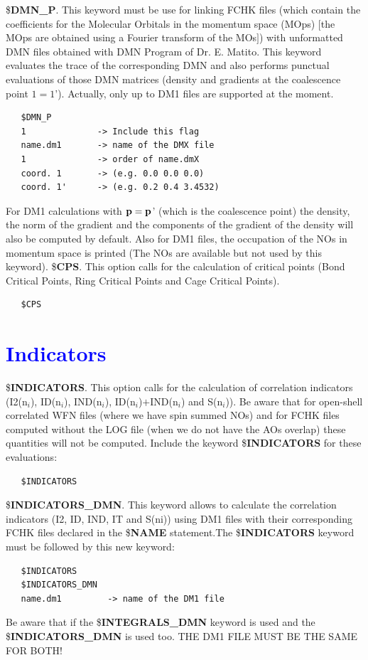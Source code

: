 \documentclass[10pt,a4paper]{article}
\newcommand{\tbl}[1]{{\textcolor{blue}{#1}}}
\begin{document}
\newline
\newline
\noindent \$\textbf{DMN\_P}. This keyword must be use for linking FCHK files (which contain the coefficients for the Molecular Orbitals in the momentum space (MOps) $[$the MOps are obtained using a Fourier transform of the MOs$]$) with unformatted DMN files obtained with DMN Program of Dr. E. Matito. This keyword evaluates the trace of the corresponding DMN and also performs punctual evaluations of those DMN matrices (density and gradients at the coalescence point $1=1$'). Actually, only up to DM1 files are supported at the moment.
\begin{verbatim}
   $DMN_P
   1              -> Include this flag
   name.dm1       -> name of the DMX file
   1              -> order of name.dmX
   coord. 1       -> (e.g. 0.0 0.0 0.0)
   coord. 1'      -> (e.g. 0.2 0.4 3.4532)
\end{verbatim}
For DM1 calculations with ${\bf p} ={\bf p}$' (which is the coalescence point) the density, the norm of the gradient and the components of the gradient of the density will also be computed by default. Also for DM1 files, the occupation of the NOs in momentum space is printed (The NOs are available but not used by this keyword). 
\newline
\newline
\noindent \$\textbf{CPS}. This option calls for the calculation of critical points (Bond Critical Points, Ring Critical Points and Cage Critical Points).\newline
\begin{verbatim}
   $CPS
\end{verbatim}
\section{\tbl{\textbf{Indicators}}}
\noindent \$\textbf{INDICATORS}. This option calls for the calculation of correlation indicators (I2(n$_i$), ID(n$_i$), IND(n$_i$), ID(n$_i$)$+$IND(n$_i$) and S(n$_i$)). Be aware that for open-shell correlated WFN files (where we have spin summed NOs) and for FCHK files computed without the LOG file (when we do not have the AOs overlap) these quantities will not be computed. Include the keyword \$\textbf{INDICATORS} for these evaluations: \newline
\begin{verbatim}
   $INDICATORS
\end{verbatim}
\noindent \$\textbf{INDICATORS\_DMN}. This keyword allows to calculate the correlation indicators (I2, ID, IND, IT and S(ni)) using DM1 files with their corresponding FCHK files declared in the \$\textbf{NAME} statement.\newline The \$\textbf{INDICATORS} keyword must be followed by this new keyword:
\begin{verbatim}
   $INDICATORS
   $INDICATORS_DMN
   name.dm1         -> name of the DM1 file
\end{verbatim}
\noindent Be aware that if the \$\textbf{INTEGRALS\_DMN} keyword is used and the \newline\$\textbf{INDICATORS\_DMN} is used too. THE DM1 FILE MUST BE THE SAME FOR BOTH!   
\newline
\newline
\end{document}
